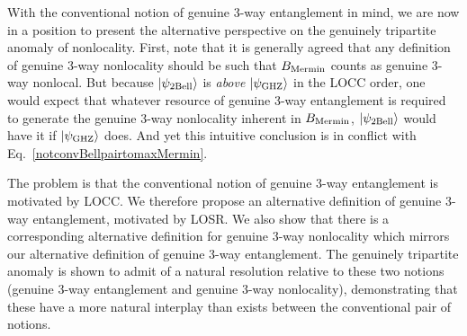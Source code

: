 \documentclass[12pt]{article}
\newcommand{\ket}[1]{\left| #1 \right>}
\theoremstyle{plain}
\theoremstyle{definition}
\begin{document}
With the conventional notion of genuine 3-way entanglement in mind,
we are now in a position to present the alternative perspective on the genuinely tripartite anomaly of nonlocality.
First, note that it is generally agreed that any definition of genuine 3-way nonlocality should be such that $B_{\rm Mermin}$  counts as genuine 3-way nonlocal.
But because
 $\ket{\psi_{\rm 2Bell}}$ is {\em above} $\ket{\psi_{\rm GHZ}}$ in the LOCC order, one would expect that whatever resource of genuine 3-way entanglement is required to generate the genuine 3-way nonlocality inherent in $B_{\rm Mermin}$, $\ket{\psi_{\rm 2Bell}}$ would have it if $\ket{\psi_{\rm GHZ}}$ does.  And yet this intuitive conclusion is in conflict with
 Eq.~\eqref{notconvBellpairtomaxMermin}.  


The problem is that the conventional notion of genuine 3-way entanglement is motivated by LOCC.
 We therefore propose an alternative definition of genuine 3-way entanglement, motivated by LOSR.  We also show that there is a corresponding alternative definition for genuine 3-way nonlocality which mirrors our alternative definition of genuine 3-way entanglement.  The genuinely tripartite anomaly is shown to admit of a natural resolution relative to these two notions (genuine 3-way entanglement and genuine 3-way nonlocality), demonstrating that these have a more natural interplay than exists between the conventional pair of notions.
\end{document}
